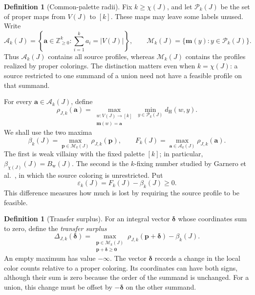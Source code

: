 \documentclass[11pt,reqno]{amsart}
\numberwithin{equation}{section}
\theoremstyle{definition}
\newtheorem{definition}[theorem]{Definition}
\theoremstyle{remark}
\begin{document}
\begin{definition}[Common-palette radii]\label{def:common-palette}
Fix $k\ge\chi(J)$, and let $\mathcal P_k(J)$ be
the set of proper maps from $V(J)$ to $[k]$.  These maps may leave some
labels unused.  Write
\[
 \mathcal A_k(J)=
 \left\{\mathbf a\in\mathbb Z_{\ge0}^k:
          \sum_{i=1}^k a_i=|V(J)|\right\},
 \qquad
 \mathcal M_k(J)=\{\mathbf m(y):y\in\mathcal P_k(J)\}.
\]
Thus $\mathcal A_k(J)$ contains all source profiles, whereas
$\mathcal M_k(J)$ contains the profiles realized by proper colorings.
The distinction matters even when $k=\chi(J)$: a source restricted to
one summand of a union need not have a feasible profile on that summand.

For every $\mathbf a\in\mathcal A_k(J)$, define
\[
 \rho_{J,k}(\mathbf a)=
 \max_{\substack{w:V(J)\to[k]\\\mathbf m(w)=\mathbf a}}
 \min_{y\in\mathcal P_k(J)}d_{\mathrm H}(w,y).
\]
We shall use the two maxima
\begin{equation}\label{union:palette-radii}
 \beta_k(J)=\max_{\mathbf p\in\mathcal M_k(J)}
                      \rho_{J,k}(\mathbf p),
 \qquad
 F_k(J)=\max_{\mathbf a\in\mathcal A_k(J)}
                      \rho_{J,k}(\mathbf a).
\end{equation}
The first is weak villainy with the fixed palette $[k]$; in particular,
$\beta_{\chi(J)}(J)=B_{\mathrm w}(J)$.
The second is the $k$-fixing number studied by
Garnero et al.~\cite{garnero2018}, in which the source coloring is
unrestricted.  Put
\[
 \varepsilon_k(J)=F_k(J)-\beta_k(J)\ge0.
\]
This difference measures how much is lost by requiring the source
profile to be feasible.
\end{definition}

\begin{definition}[Transfer surplus]\label{def:transfer-surplus}
For an integral vector $\boldsymbol\delta$ whose coordinates sum to
zero, define the \emph{transfer surplus}
\begin{equation}\label{union:surplus-definition}
 \Delta_{J,k}(\boldsymbol\delta)=
 \max_{\substack{\mathbf p\in\mathcal M_k(J)\\
                 \mathbf p+\boldsymbol\delta\ge\mathbf0}}
       \rho_{J,k}(\mathbf p+\boldsymbol\delta)-\beta_k(J).
\end{equation}
An empty maximum has value $-\infty$.  The vector
$\boldsymbol\delta$ records a change in the local color counts relative
to a proper coloring.  Its coordinates can have both signs, although
their sum is zero because the order of the summand is unchanged.
For a union, this change must be offset by
$-\boldsymbol\delta$ on the other summand.
\end{definition}
\end{document}
